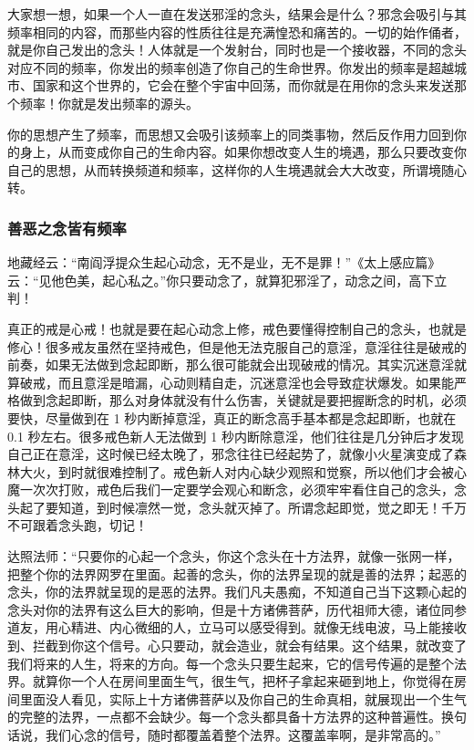 \documentclass{ctexart}
\begin{document}
大家想一想，如果一个人一直在发送邪淫的念头，结果会是什么？邪念会吸引与其频率相同的内容，而那些内容的性质往往是充满惶恐和痛苦的。一切的始作俑者，就是你自己发出的念头！人体就是一个发射台，同时也是一个接收器，不同的念头对应不同的频率，你发出的频率创造了你自己的生命世界。你发出的频率是超越城市、国家和这个世界的，它会在整个宇宙中回荡，而你就是在用你的念头来发送那个频率！你就是发出频率的源头。

你的思想产生了频率，而思想又会吸引该频率上的同类事物，然后反作用力回到你的身上，从而变成你自己的生命内容。如果你想改变人生的境遇，那么只要改变你自己的思想，从而转换频道和频率，这样你的人生境遇就会大大改变，所谓境随心转。

\subsubsection{善恶之念皆有频率}

地藏经云：“南阎浮提众生起心动念，无不是业，无不是罪！”《太上感应篇》云：“见他色美，起心私之。”你只要动念了，就算犯邪淫了，动念之间，高下立判！

真正的戒是心戒！也就是要在起心动念上修，戒色要懂得控制自己的念头，也就是修心！很多戒友虽然在坚持戒色，但是他无法克服自己的意淫，意淫往往是破戒的前奏，如果无法做到念起即断，那么很可能就会出现破戒的情况。其实沉迷意淫就算破戒，而且意淫是暗漏，心动则精自走，沉迷意淫也会导致症状爆发。如果能严格做到念起即断，那么对身体就没有什么伤害，关键就是要把握断念的时机，必须要快，尽量做到在 1 秒内断掉意淫，真正的断念高手基本都是念起即断，也就在 0.1 秒左右。很多戒色新人无法做到 1 秒内断除意淫，他们往往是几分钟后才发现自己正在意淫，这时候已经太晚了，邪念往往已经起势了，就像小火星演变成了森林大火，到时就很难控制了。戒色新人对内心缺少观照和觉察，所以他们才会被心魔一次次打败，戒色后我们一定要学会观心和断念，必须牢牢看住自己的念头，念头起了要知道，到时候凛然一觉，念头就灭掉了。所谓念起即觉，觉之即无！千万不可跟着念头跑，切记！

达照法师：“只要你的心起一个念头，你这个念头在十方法界，就像一张网一样，把整个你的法界网罗在里面。起善的念头，你的法界呈现的就是善的法界；起恶的念头，你的法界就呈现的是恶的法界。我们凡夫愚痴，不知道自己当下这颗心起的念头对你的法界有这么巨大的影响，但是十方诸佛菩萨，历代祖师大德，诸位同参道友，用心精进、内心微细的人，立马可以感受得到。就像无线电波，马上能接收到、拦截到你这个信号。心只要动，就会造业，就会有结果。这个结果，就改变了我们将来的人生，将来的方向。每一个念头只要生起来，它的信号传遍的是整个法界。就算你一个人在房间里面生气，很生气，把杯子拿起来砸到地上，你觉得在房间里面没人看见，实际上十方诸佛菩萨以及你自己的生命真相，就展现出一个生气的完整的法界，一点都不会缺少。每一个念头都具备十方法界的这种普遍性。换句话说，我们心念的信号，随时都覆盖着整个法界。这覆盖率啊，是非常高的。”
\end{document}
